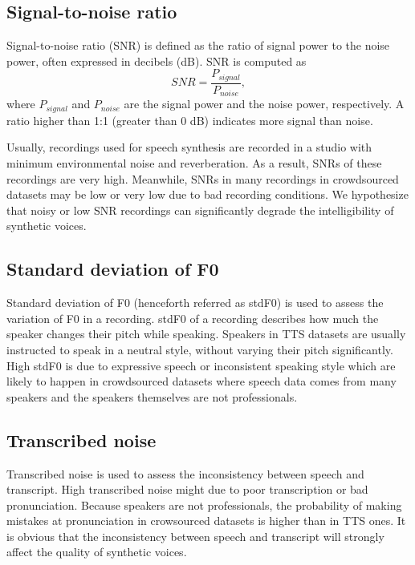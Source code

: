 \documentclass[12pt]{article}
\begin{document}
\subsection{Signal-to-noise ratio}
Signal-to-noise ratio (SNR) is defined as the ratio of signal power to the noise power, often expressed in decibels (dB). SNR is computed as
\begin{equation}\label{exp_SNR}
    SNR = \frac{P_{signal}}{P_{noise}},
\end{equation}
where $P_{signal}$ and $P_{noise}$ are the signal power and the noise power, respectively. A ratio higher than 1:1 (greater than 0 dB) indicates more signal than noise.

Usually, recordings used for speech synthesis are recorded in a studio with minimum environmental noise and reverberation. As a result, SNRs of these recordings are very high. Meanwhile, SNRs in many recordings in crowdsourced datasets may be low or very low due to bad recording conditions.
We hypothesize that noisy or low SNR recordings can significantly degrade the intelligibility of synthetic voices.

\subsection{Standard deviation of F0}
Standard deviation of F0 (henceforth referred as stdF0) is used to assess the variation of F0 in a recording. stdF0 of a recording describes how much the speaker changes their pitch while speaking. Speakers in TTS datasets are usually instructed to speak in a neutral style, without varying their pitch significantly. High stdF0 is due to expressive speech or inconsistent speaking style which are likely to happen in crowdsourced datasets where speech data comes from many speakers and the speakers themselves are not professionals.

\subsection{Transcribed noise}
Transcribed noise is used to assess the inconsistency between speech and transcript. High transcribed noise might due to poor transcription or bad pronunciation. Because speakers are not professionals, the probability of making mistakes at pronunciation in crowsourced datasets is higher than in TTS ones. It is obvious that the inconsistency between speech and transcript will strongly affect the quality of synthetic voices.

\end{document}
